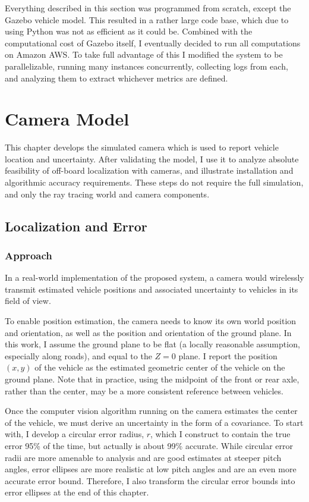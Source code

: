 \documentclass[a4paper,12pt,twoside,openright]{report}
\begin{document}
Everything described in this section was programmed from scratch,
except the Gazebo vehicle model. This resulted in a rather large
code base, which due to using Python was not as efficient as it could be.
Combined with the computational cost of Gazebo itself, I eventually
decided to run all computations on Amazon AWS. To take full
advantage of this I modified the system to be 
parallelizable, running many instances concurrently, collecting
logs from each, and analyzing them to extract whichever metrics
are defined.

\chapter{Camera Model}
\label{chap:cameramodel}

This chapter develops the simulated camera which is used to report vehicle 
location and uncertainty. After validating the model, I use it to analyze
absolute feasibility of off-board localization with cameras, and
illustrate installation and algorithmic accuracy requirements. These
steps do not require the full simulation, and only the ray tracing
world and camera components.
 
\section{Localization and Error}

\subsection{Approach}

In a real-world implementation of the proposed system, a camera would wirelessly
transmit estimated vehicle positions and associated uncertainty to vehicles in its field of view.

To enable position estimation, the camera needs to know its own world position and orientation, 
as well as the position and orientation of the ground plane. In this work,
I assume the ground plane to be flat (a locally reasonable assumption, especially along roads), 
and equal to the $Z = 0$ plane. I report the position $(x,y)$ of the vehicle
as the estimated geometric center of the vehicle on the ground plane. 
Note that in practice, using the midpoint of the front or rear axle, rather than the center, 
may be a more consistent reference between vehicles.

Once the computer vision algorithm running on the camera estimates the center of the vehicle,
we must derive an uncertainty in the form of a covariance.  To start with, I develop a
circular error radius, $r$, which I construct to contain the true error 95\% of the time, but
actually is about 99\% accurate. 
While circular error radii are more amenable to analysis and are good
estimates at steeper pitch angles, error ellipses are more realistic at low pitch angles and are an 
even more accurate error bound. Therefore, I also transform the circular error bounds into error ellipses at the end of this chapter.
\end{document}
